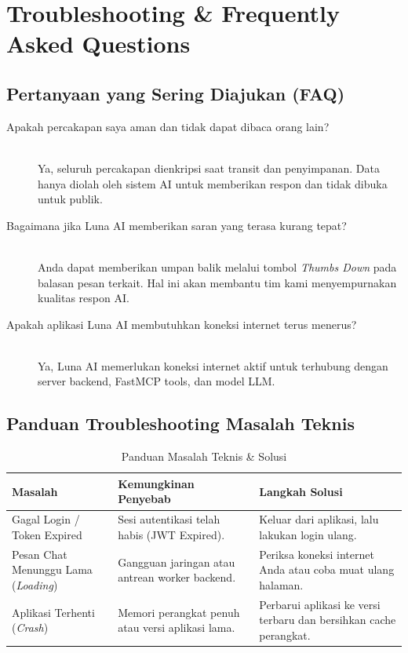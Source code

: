 \chapter{Troubleshooting \& Frequently Asked Questions}

\section{Pertanyaan yang Sering Diajukan (FAQ)}

\begin{description}
    \item[Apakah percakapan saya aman dan tidak dapat dibaca orang lain?] \hfill \\
    Ya, seluruh percakapan dienkripsi saat transit dan penyimpanan. Data hanya diolah oleh sistem AI untuk memberikan respon dan tidak dibuka untuk publik.
    
    \item[Bagaimana jika Luna AI memberikan saran yang terasa kurang tepat?] \hfill \\
    Anda dapat memberikan umpan balik melalui tombol \textit{Thumbs Down} pada balasan pesan terkait. Hal ini akan membantu tim kami menyempurnakan kualitas respon AI.
    
    \item[Apakah aplikasi Luna AI membutuhkan koneksi internet terus menerus?] \hfill \\
    Ya, Luna AI memerlukan koneksi internet aktif untuk terhubung dengan server backend, FastMCP tools, dan model LLM.
\end{description}

\section{Panduan Troubleshooting Masalah Teknis}

\begin{table}[htbp]
    \centering
    \caption{Panduan Masalah Teknis \& Solusi}
    \begin{tabular}{p{4cm} p{5.5cm} p{5.5cm}}
        \toprule
        \textbf{Masalah} & \textbf{Kemungkinan Penyebab} & \textbf{Langkah Solusi} \\
        \midrule
        Gagal Login / Token Expired & Sesi autentikasi telah habis (JWT Expired). & Keluar dari aplikasi, lalu lakukan login ulang. \\
        \addlinespace
        Pesan Chat Menunggu Lama (\textit{Loading}) & Gangguan jaringan atau antrean worker backend. & Periksa koneksi internet Anda atau coba muat ulang halaman. \\
        \addlinespace
        Aplikasi Terhenti (\textit{Crash}) & Memori perangkat penuh atau versi aplikasi lama. & Perbarui aplikasi ke versi terbaru dan bersihkan cache perangkat. \\
        \bottomrule
    \end{tabular}
\end{table}

